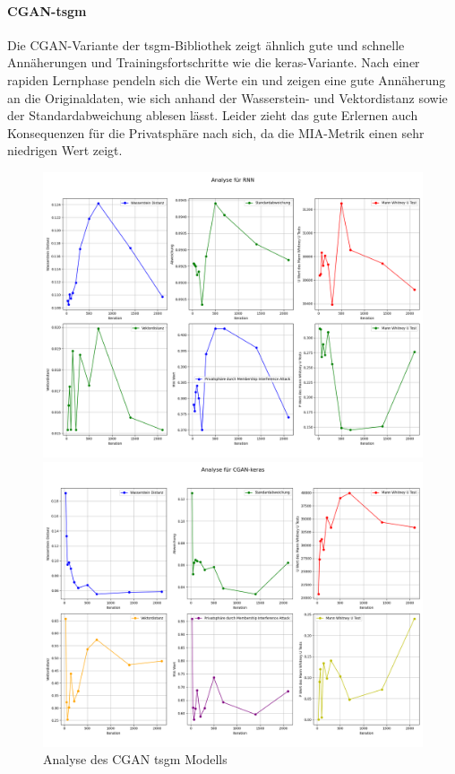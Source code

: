 \paragraph{\textbf{CGAN-tsgm}}
Die CGAN-Variante der tsgm-Bibliothek zeigt ähnlich gute und schnelle Annäherungen und Trainingsfortschritte wie die keras-Variante. Nach einer rapiden Lernphase pendeln sich die Werte ein und zeigen eine gute Annäherung an die Originaldaten,
wie sich anhand der Wasserstein- und Vektordistanz sowie der Standardabweichung ablesen lässt. Leider zieht das gute Erlernen auch Konsequenzen für die Privatsphäre nach sich, da die \ac{MIA}-Metrik einen sehr niedrigen Wert zeigt.


\begin{figure}[ht]
    \centering
    \begin{minipage}{0.5\textwidth}
        \centering
        \includegraphics[width=\textwidth]{includes/figures/graphs/RNN_analysis.png}
        \caption{Analyse des CGAN tsgm Modells}
        \label{fig:graphs_cgan_tsgm_analysis}
    \end{minipage}\hfill
    \begin{minipage}{0.5\textwidth}
        \centering
        \includegraphics[width=\textwidth]{includes/figures/graphs/CGAN-keras_analysis.png}

\end{minipage}
\end{figure}
